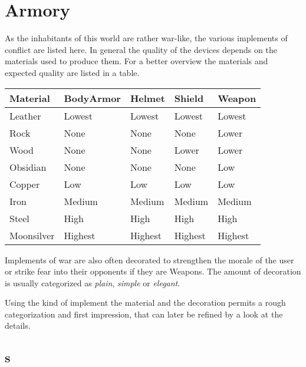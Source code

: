 \section{Armory}\label{ch:Goods:Armory}

As the inhabitants of this world are rather war-like, the various implements of
conflict are listed here. In general the quality of the devices depends on the
materials used to produce them. For a better overview the materials and
expected quality are listed in a table.

\begin{longtable}{lllll}
	\toprule
	Material   & \Gls{BodyArmor} & \Gls{Helmet} & \Gls{Shield} & \Gls{Weapon} \\
	\midrule
	Leather    & Lowest          & Lowest       & Lowest       & Lowest       \\
	Rock       & None            & None         & None         & Lower        \\
	Wood       & None            & None         & Lower        & Lower        \\
	Obsidian   & None            & None         & None         & Low          \\
	Copper     & Low             & Low          & Low          & Low          \\
	Iron       & Medium          & Medium       & Medium       & Medium       \\
	Steel      & High            & High         & High         & High         \\ %
	Moonsilver & Highest         & Highest      & Highest      & Highest      \\
	\bottomrule
\end{longtable}

Implements of war are also often decorated to strengthen the morale of the user
or strike fear into their opponents if they are \glspl{Weapon}. The amount of
decoration is usually categorized as \emph{plain}, \emph{simple} or
\emph{elegant}.

Using the kind of implement the material and the decoration permits a rough
categorization and first impression, that can later be refined by a look at the
details.

\subsection{s}\label{ch:Goods:Armory:Weapons}

